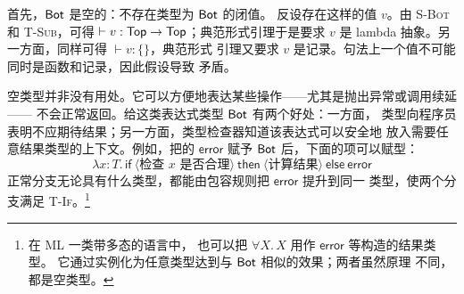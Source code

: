 首先，\(\mathsf{Bot}\) 是空的：不存在类型为 \(\mathsf{Bot}\) 的闭值。
反设存在这样的值 \(v\)。由 \textsc{S-Bot} 和 \textsc{T-Sub}，可得
\(\vdash v:\mathsf{Top}\to\mathsf{Top}\)；典范形式引理于是要求
\(v\) 是 lambda 抽象。另一方面，同样可得 \(\vdash v:\{\}\)，典范形式
引理又要求 \(v\) 是记录。句法上一个值不可能同时是函数和记录，因此假设导致
矛盾。

空类型并非没有用处。它可以方便地表达某些操作——尤其是抛出异常或调用续延——
不会正常返回。给这类表达式类型 \(\mathsf{Bot}\) 有两个好处：一方面，
类型向程序员表明不应期待结果；另一方面，类型检查器知道该表达式可以安全地
放入需要任意结果类型的上下文。例如，把的
\(\mathsf{error}\) 赋予 \(\mathsf{Bot}\) 后，下面的项可以赋型：
\[
\lambda x:T.\,
\mathsf{if}\ \langle\text{检查 }x\text{ 是否合理}\rangle\
\mathsf{then}\ \langle\text{计算结果}\rangle\
\mathsf{else}\ \mathsf{error}
\]
正常分支无论具有什么类型，都能由包容规则把 \(\mathsf{error}\) 提升到同一
类型，使两个分支满足 \textsc{T-If}。\footnote{在 ML 一类带多态的语言中，
也可以把 \(\forall X.\,X\) 用作 \(\mathsf{error}\) 等构造的结果类型。
它通过实例化为任意类型达到与 \(\mathsf{Bot}\) 相似的效果；两者虽然原理
不同，都是空类型。}

